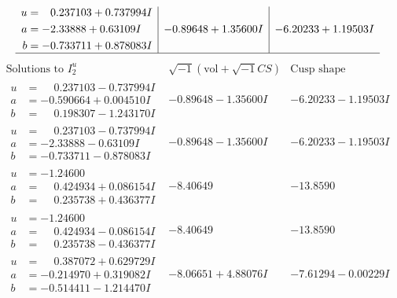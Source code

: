 \documentclass[1p]{elsarticle_modified}
\theoremstyle{definition}
\newcommand{\I}{\sqrt{-1}}
\begin{document}
$$\begin{array}{c|c|c}
\begin{aligned}
u &= \phantom{-}0.237103 + 0.737994 I \\
a &= -2.33888 + 0.63109 I \\
b &= -0.733711 + 0.878083 I\end{aligned}
 & -0.89648 + 1.35600 I & -6.20233 + 1.19503 I\\
 \hline 
 \end{array}$$\newpage$$\begin{array}{c|c|c}  
\text{Solutions to }I^u_{2}& \I (\text{vol} + \sqrt{-1}CS) & \text{Cusp shape}\\
 \hline 
\begin{aligned}
u &= \phantom{-}0.237103 - 0.737994 I \\
a &= -0.590664 + 0.004510 I \\
b &= \phantom{-}0.198307 - 1.243170 I\end{aligned}
 & -0.89648 - 1.35600 I & -6.20233 - 1.19503 I \\ \hline\begin{aligned}
u &= \phantom{-}0.237103 - 0.737994 I \\
a &= -2.33888 - 0.63109 I \\
b &= -0.733711 - 0.878083 I\end{aligned}
 & -0.89648 - 1.35600 I & -6.20233 - 1.19503 I \\ \hline\begin{aligned}
u &= -1.24600\phantom{ +0.000000I} \\
a &= \phantom{-}0.424934 + 0.086154 I \\
b &= \phantom{-}0.235738 + 0.436377 I\end{aligned}
 & -8.40649\phantom{ +0.000000I} & -13.8590\phantom{ +0.000000I} \\ \hline\begin{aligned}
u &= -1.24600\phantom{ +0.000000I} \\
a &= \phantom{-}0.424934 - 0.086154 I \\
b &= \phantom{-}0.235738 - 0.436377 I\end{aligned}
 & -8.40649\phantom{ +0.000000I} & -13.8590\phantom{ +0.000000I} \\ \hline\begin{aligned}
u &= \phantom{-}0.387072 + 0.629729 I \\
a &= -0.214970 + 0.319082 I \\
b &= -0.514411 - 1.214470 I\end{aligned}
 & -8.06651 + 4.88076 I & -7.61294 - 0.00229 I \\ \hline\begin{aligned}

\end{aligned}
\end{array}$$
\end{document}
